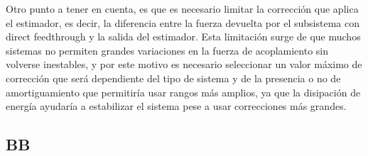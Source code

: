 Otro punto a tener en cuenta, es que es necesario limitar la corrección que aplica el estimador, es decir, la diferencia entre la fuerza devuelta por el subsistema con direct feedthrough y la salida del estimador.
Esta limitación surge de que muchos sistemas no permiten grandes variaciones en la fuerza de acoplamiento sin volverse inestables, y por este motivo es necesario seleccionar un valor máximo de corrección que será dependiente del tipo de sistema y de la presencia o no de amortiguamiento que permitiría usar rangos más amplios, ya que la disipación de energía ayudaría a estabilizar el sistema pese a usar correcciones más grandes.

\subsection{BB}


